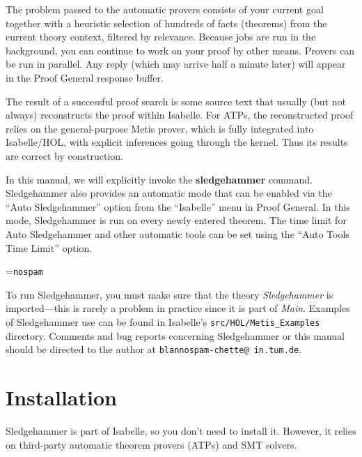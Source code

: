 \documentclass[a4paper,12pt]{article}
\begin{document}
The problem passed to the automatic provers consists of your current goal
together with a heuristic selection of hundreds of facts (theorems) from the
current theory context, filtered by relevance. Because jobs are run in the
background, you can continue to work on your proof by other means. Provers can
be run in parallel. Any reply (which may arrive half a minute later) will appear
in the Proof General response buffer.

The result of a successful proof search is some source text that usually (but
not always) reconstructs the proof within Isabelle. For ATPs, the reconstructed
proof relies on the general-purpose Metis prover, which is fully integrated into
Isabelle/HOL, with explicit inferences going through the kernel. Thus its
results are correct by construction.

In this manual, we will explicitly invoke the \textbf{sledgehammer} command.
Sledgehammer also provides an automatic mode that can be enabled via the
``Auto Sledgehammer'' option from the ``Isabelle'' menu in Proof General. In
this mode, Sledgehammer is run on every newly entered theorem. The time limit
for Auto Sledgehammer and other automatic tools can be set using the ``Auto
Tools Time Limit'' option.

\newbox\boxA
\setbox\boxA=\hbox{\texttt{nospam}}

\newcommand\authoremail{\texttt{blan{\color{white}nospam}\kern-\wd\boxA{}chette@\allowbreak
in.\allowbreak tum.\allowbreak de}}

To run Sledgehammer, you must make sure that the theory \textit{Sledgehammer} is
imported---this is rarely a problem in practice since it is part of
\textit{Main}. Examples of Sledgehammer use can be found in Isabelle's
\texttt{src/HOL/Metis\_Examples} directory.
Comments and bug reports concerning Sledgehammer or this manual should be
directed to the author at \authoremail.

\smallskipamount


\section{Installation}
\label{installation}

Sledgehammer is part of Isabelle, so you don't need to install it. However, it
relies on third-party automatic theorem provers (ATPs) and SMT solvers.
\end{document}
